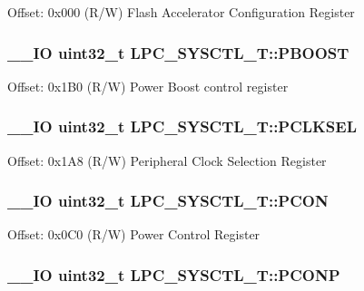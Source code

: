Offset\+: 0x000 (R/\+W) Flash Accelerator Configuration Register \hypertarget{struct_l_p_c___s_y_s_c_t_l___t_acc912b84bbe8dc170fdf50300d341acb}{
\subsubsection[{P\+B\+O\+O\+S\+T}]{\setlength{\rightskip}{0pt plus 5cm}\+\_\+\+\_\+\+I\+O uint32\+\_\+t L\+P\+C\+\_\+\+S\+Y\+S\+C\+T\+L\+\_\+\+T\+::\+P\+B\+O\+O\+S\+T}}\label{struct_l_p_c___s_y_s_c_t_l___t_acc912b84bbe8dc170fdf50300d341acb}
Offset\+: 0x1\+B0 (R/\+W) Power Boost control register \hypertarget{struct_l_p_c___s_y_s_c_t_l___t_a55111e26d098f9e4ee0dbfd5b243a014}{
\subsubsection[{P\+C\+L\+K\+S\+E\+L}]{\setlength{\rightskip}{0pt plus 5cm}\+\_\+\+\_\+\+I\+O uint32\+\_\+t L\+P\+C\+\_\+\+S\+Y\+S\+C\+T\+L\+\_\+\+T\+::\+P\+C\+L\+K\+S\+E\+L}}\label{struct_l_p_c___s_y_s_c_t_l___t_a55111e26d098f9e4ee0dbfd5b243a014}
Offset\+: 0x1\+A8 (R/\+W) Peripheral Clock Selection Register \hypertarget{struct_l_p_c___s_y_s_c_t_l___t_a92e2ea242fb2d75af44c1979a8cf9ce4}{
\subsubsection[{P\+C\+O\+N}]{\setlength{\rightskip}{0pt plus 5cm}\+\_\+\+\_\+\+I\+O uint32\+\_\+t L\+P\+C\+\_\+\+S\+Y\+S\+C\+T\+L\+\_\+\+T\+::\+P\+C\+O\+N}}\label{struct_l_p_c___s_y_s_c_t_l___t_a92e2ea242fb2d75af44c1979a8cf9ce4}
Offset\+: 0x0\+C0 (R/\+W) Power Control Register \hypertarget{struct_l_p_c___s_y_s_c_t_l___t_a27650e24e19bd3b8db140db39d9ab1c4}{
\subsubsection[{P\+C\+O\+N\+P}]{\setlength{\rightskip}{0pt plus 5cm}\+\_\+\+\_\+\+I\+O uint32\+\_\+t L\+P\+C\+\_\+\+S\+Y\+S\+C\+T\+L\+\_\+\+T\+::\+P\+C\+O\+N\+P}}\label{struct_l_p_c___s_y_s_c_t_l___t_a27650e24e19bd3b8db140db39d9ab1c4}
